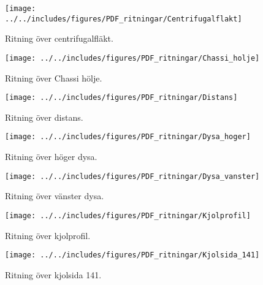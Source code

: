 \begin{landscape}
\begin{figure}[htbp!]
\centering
\texttt{[image: ../../includes/figures/PDF\_ritningar/Centrifugalflakt]}
\caption{Ritning över centrifugalfläkt.}
\label{fig:Centrifugalfläkt}
\end{figure}
\end{landscape}

\begin{landscape}
\begin{figure}[htbp!]
\centering
\texttt{[image: ../../includes/figures/PDF\_ritningar/Chassi\_holje]}
\caption{Ritning över Chassi hölje.}
\label{fig:Chassi_holje}
\end{figure}
\end{landscape}

\begin{landscape}
\begin{figure}[htbp!]
\centering
\texttt{[image: ../../includes/figures/PDF\_ritningar/Distans]}
\caption{Ritning över distans.}
\label{fig:Distans}
\end{figure}
\end{landscape}

\begin{landscape}
\begin{figure}[htbp!]
\centering
\texttt{[image: ../../includes/figures/PDF\_ritningar/Dysa\_hoger]}
\caption{Ritning över höger dysa.}
\label{fig:Dysa-höger}
\end{figure}
\end{landscape}

\begin{landscape}
\begin{figure}[htbp!]
\centering
\texttt{[image: ../../includes/figures/PDF\_ritningar/Dysa\_vanster]}
\caption{Ritning över vänster dysa.}
\label{fig:Dysa-höger}
\end{figure}
\end{landscape}

\begin{landscape}
\begin{figure}[htbp!]
\centering
\texttt{[image: ../../includes/figures/PDF\_ritningar/Kjolprofil]}
\caption{Ritning över kjolprofil.}
\label{fig:Kjolprofil}
\end{figure}
\end{landscape}

\begin{landscape}
\begin{figure}[htbp!]
\centering
\texttt{[image: ../../includes/figures/PDF\_ritningar/Kjolsida\_141]}
\caption{Ritning över kjolsida 141.}
\label{fig:kjolsida141}
\end{figure}
\end{landscape}

